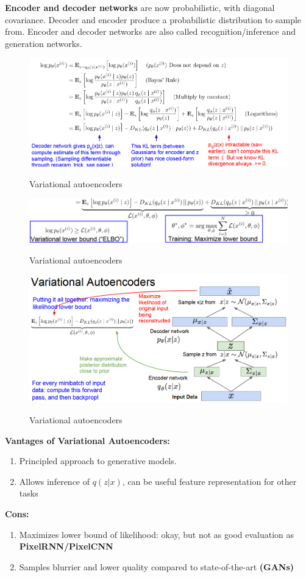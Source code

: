 \documentclass[11pt]{article}
\begin{document}
\textbf{Encoder and decoder  networks} are now probabilistic, with diagonal covariance. Decoder and encoder produce a probabilistic distribution to sample from. Encoder and decoder networks are also called recognition/inference and generation networks.
\begin{figure}[h]
\centering
\captionsetup{justification=centering}
\includegraphics[width=0.8\linewidth]{L1220.pdf}
\label{fig:L1220}
\caption{Variational autoencoders}
\end{figure}
\begin{figure}[h]
\centering
\captionsetup{justification=centering}
\includegraphics[width=0.7\linewidth]{L1222.pdf}
\label{fig:L1222}
\caption{Variational autoencoders}
\end{figure}
\clearpage
\begin{figure}[h]
\centering
\captionsetup{justification=centering}
\includegraphics[width=0.9\linewidth]{L1221.pdf}
\label{fig:L1221}
\caption{Variational autoencoders}
\end{figure}
\textbf{Vantages of Variational Autoencoders:}
\begin{enumerate}
    \item Principled approach to generative models.
    \item Allows inference of $q(z|x)$, can be useful feature representation for other tasks

\end{enumerate}
\textbf{Cons:}
\begin{enumerate}
    \item Maximizes lower bound of likelihood: okay, but not as good evaluation as \textbf{PixelRNN/PixelCNN}
    \item Samples blurrier and lower quality compared to state-of-the-art \textbf{(GANs)}
\end{enumerate}{}
\end{document}
